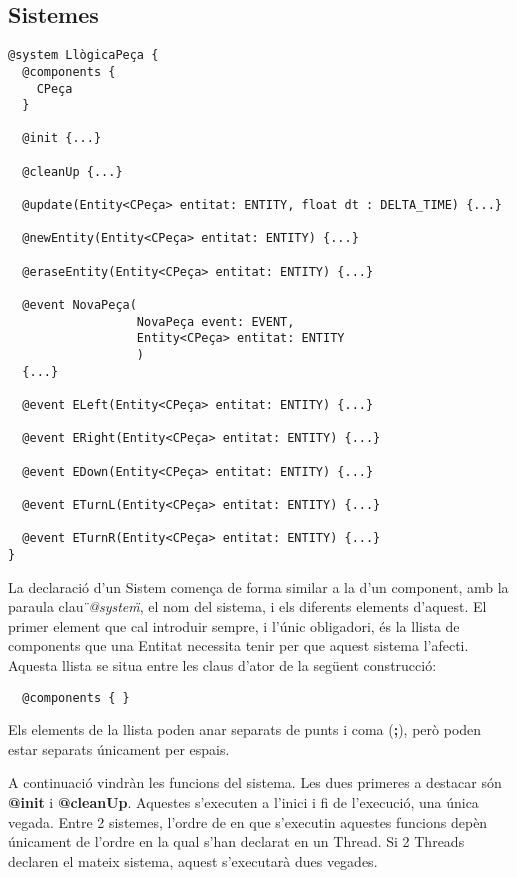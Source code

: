 \subsection{Sistemes}

\begin{verbatim}
@system LlògicaPeça {
  @components {
    CPeça
  }
  
  @init {...}
  
  @cleanUp {...}
  
  @update(Entity<CPeça> entitat: ENTITY, float dt : DELTA_TIME) {...}
  
  @newEntity(Entity<CPeça> entitat: ENTITY) {...}
  
  @eraseEntity(Entity<CPeça> entitat: ENTITY) {...}
  
  @event NovaPeça(
                  NovaPeça event: EVENT, 
                  Entity<CPeça> entitat: ENTITY
                  )
  {...}
  
  @event ELeft(Entity<CPeça> entitat: ENTITY) {...}
  
  @event ERight(Entity<CPeça> entitat: ENTITY) {...}
  
  @event EDown(Entity<CPeça> entitat: ENTITY) {...}
  
  @event ETurnL(Entity<CPeça> entitat: ENTITY) {...}
  
  @event ETurnR(Entity<CPeça> entitat: ENTITY) {...}
}
\end{verbatim}

La declaració d'un Sistem comença de forma similar a la d'un component, amb la paraula clau {\em \"{}@system\"{}}, el nom del sistema, i els diferents elements d'aquest. El primer element que cal introduir sempre, i l'únic obligadori, és la llista de components que una Entitat necessita tenir per que aquest sistema l'afecti. Aquesta llista se situa entre les claus d'ator de la següent construcció:

\begin{verbatim}
  @components { }
\end{verbatim}

Els elements de la llista poden anar separats de punts i coma ({\bf ;}), però poden estar separats únicament per espais.

A continuació vindràn les funcions del sistema. Les dues primeres a destacar són {\bf @init} i {\bf @cleanUp}. Aquestes s'executen a l'inici i fi de l'execució, una única vegada. Entre 2 sistemes, l'ordre de en que s'executin aquestes funcions depèn únicament de l'ordre en la qual s'han declarat en un Thread. Si 2 Threads declaren el mateix sistema, aquest s'executarà dues vegades.

